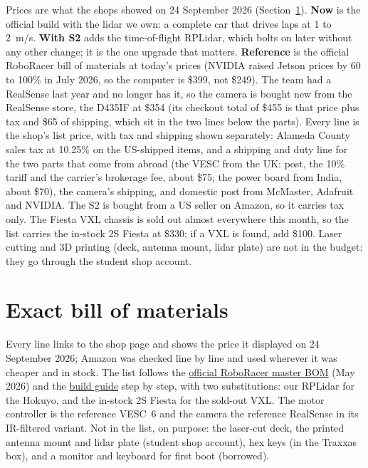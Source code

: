 \documentclass[11pt,a4paper]{article}
\begin{document}
\smallskip
Prices are what the shops showed on 24 September 2026 (Section~\ref{sec:bom}).
\textbf{Now} is the official build with the lidar we own: a complete car that drives laps
at 1 to 2~m/s. \textbf{With S2} adds the
time-of-flight RPLidar, which bolts on later without any other change; it is the one upgrade
that matters. \textbf{Reference} is the official RoboRacer bill of materials at today's
prices (NVIDIA raised Jetson prices by 60 to 100\% in July 2026, so the computer is \$399,
not \$249). The team had a RealSense last year and no longer has it, so the camera is
bought new from the RealSense store, the D435IF at \$354 (its checkout total of \$455
is that price plus tax and \$65 of shipping, which sit in the two lines below the parts).
Every line is the shop's list price, with tax and shipping shown separately: Alameda County
sales tax at 10.25\% on the US-shipped items, and a shipping and duty line for the two parts
that come from abroad (the VESC from the UK: post, the 10\% tariff and the carrier's
brokerage fee, about \$75; the power board from India, about \$70), the camera's shipping,
and domestic post from McMaster, Adafruit and NVIDIA. The S2 is bought from a US seller on
Amazon, so it carries tax only. The Fiesta VXL
chassis is sold out almost everywhere this month, so the list carries the in-stock 2S Fiesta
at \$330; if a VXL is found, add \$100. Laser cutting and 3D printing (deck, antenna mount,
lidar plate) are not in the budget: they go through the student shop account.

\section{Exact bill of materials}
\label{sec:bom}

Every line links to the shop page and shows the price it displayed on 24 September 2026;
Amazon was checked line by line and used wherever it was cheaper and in stock. The list follows the
\href{https://docs.google.com/spreadsheets/d/1WT-UdjLTnyrb7CvHcuCxKLnRIN8DWroQ/edit}{official RoboRacer master BOM}
(May 2026) and the
\href{https://f1tenth.readthedocs.io/en/foxy_test/getting_started/build_car/index.html}{build guide}
step by step, with two substitutions: our RPLidar for the Hokuyo, and the in-stock 2S
Fiesta for the sold-out VXL. The motor controller is the reference VESC~6 and the camera the
reference RealSense in its IR-filtered variant.
Not in the list, on purpose: the laser-cut deck, the printed antenna mount and lidar plate
(student shop account), hex keys (in the Traxxas box), and a monitor and keyboard for first
boot (borrowed).
\end{document}
